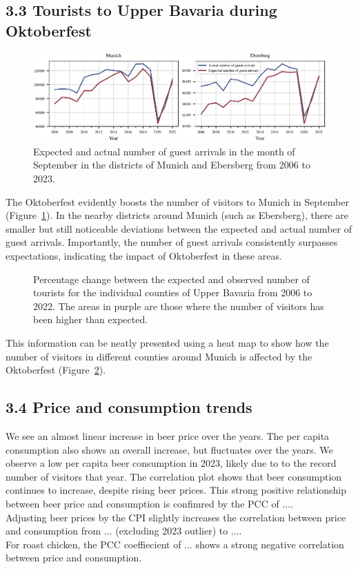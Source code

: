 \documentclass{article}
\theoremstyle{plain}
\theoremstyle{definition}
\theoremstyle{remark}
\begin{document}
\subsection*{3.3 Tourists to Upper Bavaria during Oktoberfest}
\begin{figure}[ht] %
\includegraphics{fig/actual_vs_expected_arrivals.pdf} %
\caption{Expected and actual number of guest arrivals in the month of September in the districts of Munich and Ebersberg from 2006 to 2023.}
\label{fig:exp_vs_actual_arrivals}
\end{figure}
The Oktoberfest evidently boosts the number of visitors to Munich in September (Figure~\ref{fig:exp_vs_actual_arrivals}). In the nearby districts around Munich (such as Ebersberg), there are smaller but still noticeable deviations between the expected and actual number of guest arrivals. Importantly, the number of guest arrivals consistently surpasses expectations, indicating the impact of Oktoberfest in these areas. 
\begin{figure}[ht]
  \centering
  \caption{Percentage change between the expected and observed number of tourists for the individual counties of Upper Bavaria from 2006 to 2022. The areas in purple are those where the number of visitors has been higher than expected.}
  \label{fig:heatmap}
\end{figure}
This information can be neatly presented using a heat map to show how the number of visitors in different counties around Munich is affected by the Oktoberfest (Figure~\ref{fig:heatmap}).
\subsection*{3.4 Price and consumption trends}
We see an almost linear increase in beer price over the years. The per capita consumption also shows an overall increase, but fluctuates over the years. We observe a low per capita beer consumption in 2023, likely due to to the record number of visitors that year. The correlation plot shows that beer consumption continues to increase, despite rising beer prices. This strong positive relationship between beer price and consumption is confimred by the PCC of .... \\
Adjusting beer prices by the CPI slightly increases the correlation between price and consumption from ... (excluding 2023 outlier) to ....\\
For roast chicken, the PCC coeffiecient of ... shows a strong negative correlation between price and consumption.
\end{document}
